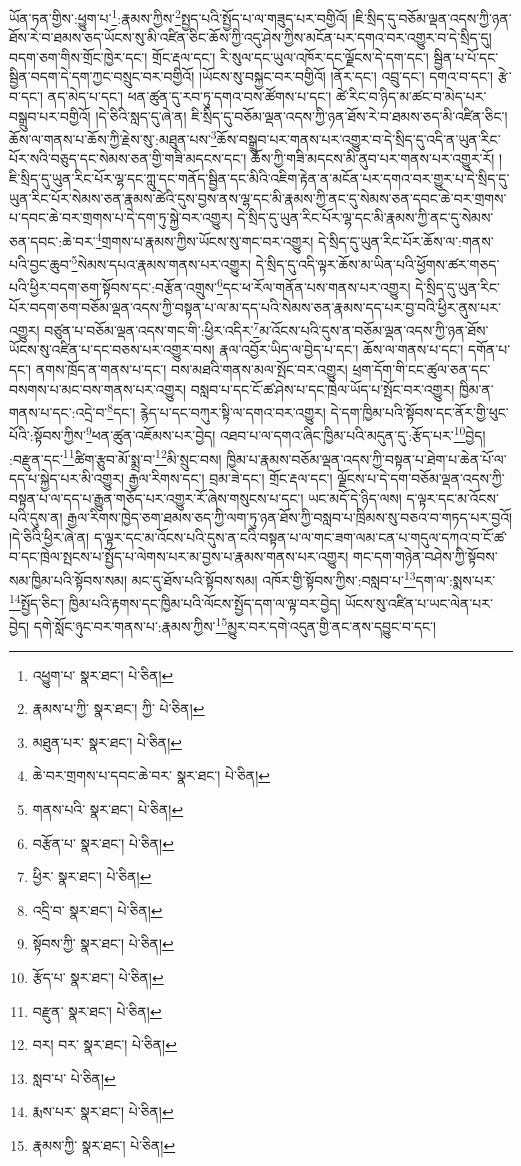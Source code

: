 ཡོན་ཏན་གྱིས་:ཕྱུག་པ་\footnote{འཕྱུག་པ་  སྣར་ཐང་།  པེ་ཅིན། }:རྣམས་ཀྱིས་\footnote{རྣམས་པ་ཀྱི་  སྣར་ཐང་། ཀྱི་  པེ་ཅིན། }སྤྱད་པའི་སྤྱོད་པ་ལ་གཟུད་པར་བགྱིའོ། །ཇི་སྲིད་དུ་བཅོམ་ལྡན་འདས་ཀྱི་ཉན་ཐོས་རེ་བ་ཐམས་ཅད་ཡོངས་སུ་མི་འཛིན་ཅིང་ཆོས་ཀྱི་འདུ་ཤེས་ཀྱིས་མངོན་པར་དགའ་བར་འགྱུར་བ་དེ་སྲིད་དུ། བདག་ཅག་གིས་གྲོང་ཁྱེར་དང་། གྲོང་རྡལ་དང་། རི་སུལ་དང་ཡུལ་འཁོར་དང་ལྗོངས་དེ་དག་དང་། སྦྱིན་པ་པོ་དང་སྦྱིན་བདག་དེ་དག་ཀྱང་བསྲུང་བར་བགྱིའོ། །ཡོངས་སུ་བསྐྱང་བར་བགྱིའོ། །ནོར་དང་། འབྲུ་དང་། དགའ་བ་དང་། རྩེ་བ་དང་། ནད་མེད་པ་དང་། ཕན་ཚུན་དུ་རབ་ཏུ་དགའ་བས་ཚོགས་པ་དང་། ཚེ་རིང་བ་ཉིད་མ་ཚང་བ་མེད་པར་བསྒྲུབ་པར་བགྱིའོ། །དེ་ཅིའི་སླད་དུ་ཞེ་ན། ཇི་སྲིད་དུ་བཅོམ་ལྡན་འདས་ཀྱི་ཉན་ཐོས་རེ་བ་ཐམས་ཅད་མི་འཛིན་ཅིང་། ཆོས་ལ་གནས་པ་ཆོས་ཀྱི་རྗེས་སུ་:མཐུན་པས་\footnote{མཐུན་པར་  སྣར་ཐང་།  པེ་ཅིན། }ཆོས་བསྒྲུབ་པར་གནས་པར་འགྱུར་བ་དེ་སྲིད་དུ་འདི་ན་ཡུན་རིང་པོར་སའི་བཅུད་དང་སེམས་ཅན་གྱི་གཟི་མདངས་དང་། ཆོས་ཀྱི་གཟི་མདངས་མི་ནུབ་པར་གནས་པར་འགྱུར་རོ། །ཇི་སྲིད་དུ་ཡུན་རིང་པོར་ལྷ་དང་ཀླུ་དང་གནོད་སྦྱིན་དང་མིའི་འཇིག་རྟེན་ན་མངོན་པར་དགའ་བར་གྱུར་པ་དེ་སྲིད་དུ་ཡུན་རིང་པོར་སེམས་ཅན་རྣམས་ཚེའི་དུས་བྱས་ནས་ལྷ་དང་མི་རྣམས་ཀྱི་ནང་དུ་སེམས་ཅན་དབང་ཆེ་བར་གྲགས་པ་དབང་ཆེ་བར་གྲགས་པ་དེ་དག་ཏུ་སྐྱེ་བར་འགྱུར། དེ་སྲིད་དུ་ཡུན་རིང་པོར་ལྷ་དང་མི་རྣམས་ཀྱི་ནང་དུ་སེམས་ཅན་དབང་:ཆེ་བར་\footnote{ཆེ་བར་གྲགས་པ་དབང་ཆེ་བར་  སྣར་ཐང་།  པེ་ཅིན། }གྲགས་པ་རྣམས་ཀྱིས་ཡོངས་སུ་གང་བར་འགྱུར། དེ་སྲིད་དུ་ཡུན་རིང་པོར་ཆོས་ལ་:གནས་པའི་བྱང་ཆུབ་\footnote{གནས་པའི་  སྣར་ཐང་།  པེ་ཅིན། }སེམས་དཔའ་རྣམས་གནས་པར་འགྱུར། དེ་སྲིད་དུ་འདི་ལྟར་ཆོས་མ་ཡིན་པའི་ཕྱོགས་ཚར་གཅད་པའི་ཕྱིར་བདག་ཅག་སྟོབས་དང་:བརྩོན་འགྲུས་\footnote{བརྩོན་པ་  སྣར་ཐང་།  པེ་ཅིན། }དང་ཕ་རོལ་གནོན་པས་གནས་པར་འགྱུར། དེ་སྲིད་དུ་ཡུན་རིང་པོར་བདག་ཅག་བཅོམ་ལྡན་འདས་ཀྱི་བསྟན་པ་ལ་མ་དད་པའི་སེམས་ཅན་རྣམས་དད་པར་བྱ་བའི་ཕྱིར་ནུས་པར་འགྱུར། བཙུན་པ་བཅོམ་ལྡན་འདས་གང་གི་:ཕྱིར་འདིར་\footnote{ཕྱིར་  སྣར་ཐང་།  པེ་ཅིན། }མ་འོངས་པའི་དུས་ན་བཅོམ་ལྡན་འདས་ཀྱི་ཉན་ཐོས་ཡོངས་སུ་འཛིན་པ་དང་བཅས་པར་འགྱུར་བས། རྣལ་འབྱོར་ཡིད་ལ་བྱེད་པ་དང་། ཆོས་ལ་གནས་པ་དང་། དགོན་པ་དང་། ནགས་ཁྲོད་ན་གནས་པ་དང་། བས་མཐའི་གནས་མལ་སྤོང་བར་འགྱུར། ཕྲག་དོག་གི་ངང་ཚུལ་ཅན་དང་བསགས་པ་མང་བས་གནས་པར་འགྱུར། བསླབ་པ་དང་ངོ་ཚ་ཤེས་པ་དང་ཁྲེལ་ཡོད་པ་སྤོང་བར་འགྱུར། ཁྱིམ་ན་གནས་པ་དང་:འདྲེ་བ་\footnote{འདྲི་བ་  སྣར་ཐང་།  པེ་ཅིན། }དང་། རྙེད་པ་དང་བཀུར་སྟི་ལ་དགའ་བར་འགྱུར། དེ་དག་ཁྱིམ་པའི་སྟོབས་དང་ནོར་གྱི་ཕུང་པོའི་:སྟོབས་ཀྱིས་\footnote{སྟོབས་ཀྱི་  སྣར་ཐང་།  པེ་ཅིན། }ཕན་ཚུན་འཇོམས་པར་བྱེད། འཐབ་པ་ལ་དགའ་ཞིང་ཁྱིམ་པའི་མདུན་དུ་:རྩོད་པར་\footnote{རྩོད་པ་  སྣར་ཐང་།  པེ་ཅིན། }བྱེད། :བརྫུན་དང་\footnote{བརྫུན་  སྣར་ཐང་།  པེ་ཅིན། }ཚིག་རྩུབ་མོ་སྨྲ་བ་\footnote{བར། བར་  སྣར་ཐང་།  པེ་ཅིན། }མི་སྲུང་བས། ཁྱིམ་པ་རྣམས་བཅོམ་ལྡན་འདས་ཀྱི་བསྟན་པ་ཐེག་པ་ཆེན་པོ་ལ་དད་པ་སྐྱེད་པར་མི་འགྱུར། རྒྱལ་རིགས་དང་། བྲམ་ཟེ་དང་། གྲོང་རྡལ་དང་། ལྗོངས་པ་དེ་དག་བཅོམ་ལྡན་འདས་ཀྱི་བསྟན་པ་ལ་དད་པ་རྒྱུན་གཅོད་པར་འགྱུར་རོ་ཞེས་གསུངས་པ་དང་། ཡང་མདོ་དེ་ཉིད་ལས། ད་ལྟར་དང་མ་འོངས་པའི་དུས་ན། རྒྱལ་རིགས་ཁྱེད་ཅག་ཐམས་ཅད་ཀྱི་ལག་ཏུ་ཉན་ཐོས་ཀྱི་བསླབ་པ་ཁྲིམས་སུ་བཅའ་བ་གཏད་པར་བྱའོ། །དེ་ཅིའི་ཕྱིར་ཞེ་ན། ད་ལྟར་དང་མ་འོངས་པའི་དུས་ན་ངའི་བསྟན་པ་ལ་གང་ཟག་ལམ་ངན་པ་གདུལ་དཀའ་བ་ངོ་ཚ་བ་དང་ཁྲེལ་སྤངས་པ་སྤྱོད་པ་ལེགས་པར་མ་བྱས་པ་རྣམས་གནས་པར་འགྱུར། གང་དག་གཉེན་བཤེས་ཀྱི་སྟོབས་སམ་ཁྱིམ་པའི་སྟོབས་སམ། མང་དུ་ཐོས་པའི་སྟོབས་སམ། འཁོར་གྱི་སྟོབས་ཀྱིས་:བསླབ་པ་\footnote{སླབ་པ་  པེ་ཅིན། }དག་ལ་:སྨས་པར་\footnote{རྨས་པར་  སྣར་ཐང་།  པེ་ཅིན། }སྤྱོད་ཅིང་། ཁྱིམ་པའི་རྟགས་དང་ཁྱིམ་པའི་ལོངས་སྤྱོད་དག་ལ་ལྟ་བར་བྱེད། ཡོངས་སུ་འཛིན་པ་ཡང་ལེན་པར་བྱེད། དགེ་སློང་ཉུང་བར་གནས་པ་:རྣམས་ཀྱིས་\footnote{རྣམས་ཀྱི་  སྣར་ཐང་།  པེ་ཅིན། }མྱུར་བར་དགེ་འདུན་གྱི་ནང་ནས་དབྱུང་བ་དང་། 
